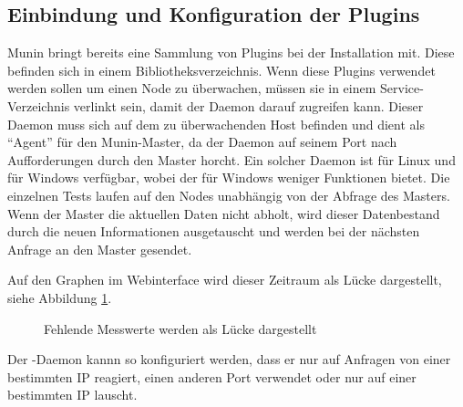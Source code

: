 \newpage

\subsection{Einbindung und Konfiguration der Plugins}
\label{plugins}
Munin bringt bereits eine Sammlung von Plugins bei der Installation mit.
Diese befinden sich in einem Bibliotheksverzeichnis.
Wenn diese Plugins verwendet werden sollen um einen Node zu überwachen, müssen sie in einem Service-Verzeichnis verlinkt sein, damit der Daemon  darauf zugreifen kann.
Dieser Daemon muss sich auf dem zu überwachenden Host befinden und dient als "`Agent"' für den Munin-Master, da der Daemon auf seinem Port nach Aufforderungen durch den Master horcht.
Ein solcher Daemon ist für Linux und für Windows verfügbar, wobei der für Windows weniger Funktionen bietet.
Die einzelnen Tests laufen auf den Nodes unabhängig von der Abfrage des Masters.
Wenn der Master die aktuellen Daten nicht abholt, wird dieser Datenbestand durch die neuen Informationen ausgetauscht und werden bei der nächsten Anfrage an den Master gesendet.

Auf den Graphen im Webinterface wird dieser Zeitraum als Lücke dargestellt, siehe Abbildung \ref{gap}.

\begin{figure}[ht]
	\centering
		\caption{Fehlende Messwerte werden als Lücke dargestellt}
		\label{gap}
\end{figure}

Der -Daemon kannn so konfiguriert werden, dass er nur auf Anfragen von einer bestimmten IP reagiert, einen anderen Port verwendet oder nur auf einer bestimmten IP lauscht.

